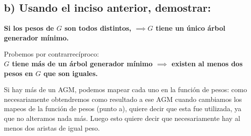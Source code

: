 \documentclass{article}
\begin{document}
\subsection*{b) Usando el inciso anterior, demostrar:}

\textbf{Si los pesos de $G$ son todos distintos, $\implies G$ tiene un único árbol generador mínimo.}

Probemos por contrarrecíproco: \\ 
\textbf{$G$ tiene más de un árbol generador mínimo $\implies$ existen al menos dos pesos en $G$ que son iguales.}

Si hay más de un AGM, podemos mapear cada uno en la función de pesos: como necesariamente obtendremos como resultado a ese AGM cuando cambiamos los mapeos de la función de pesos (punto a), quiere decir que esta fue utilizada, ya que no alteramos nada más. Luego esto quiere decir que necesariamente hay al menos dos aristas de igual peso.
\end{document}
